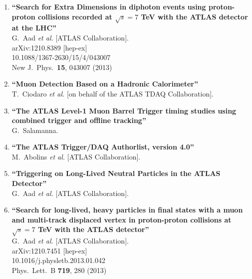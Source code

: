 \documentclass{article}
\begin{document}
\begin{enumerate}
\item%
{\bf ``Search for Extra Dimensions in diphoton events using proton-proton collisions recorded at $\sqrt{s}=7$ TeV with the ATLAS detector at the LHC''}
  \\{}G.~Aad {\it et al.}  [ATLAS Collaboration].
  \\{}arXiv:1210.8389 [hep-ex]
    \\{}10.1088/1367-2630/15/4/043007
\\{}New J.\ Phys.\  {\bf 15}, 043007 (2013) %


\item%
{\bf ``Muon Detection Based on a Hadronic Calorimeter''}
  \\{}T.~Ciodaro {\it et al.}  [on behalf of the ATLAS TDAQ Collaboration].
  



\item%
{\bf ``The ATLAS Level-1 Muon Barrel Trigger timing studies using combined trigger and offline tracking''}
  \\{}G.~Salamanna.
  



\item%
{\bf ``The ATLAS Trigger/DAQ Authorlist, version 4.0''}
  \\{}M.~Abolins {\it et al.}  [ATLAS Collaboration].
  



\item%
{\bf ``Triggering on Long-Lived Neutral Particles in the ATLAS Detector''}
  \\{}G.~Aad {\it et al.}  [ATLAS Collaboration].
  


\item%
{\bf ``Search for long-lived, heavy particles in final states with a muon and multi-track displaced vertex in proton-proton collisions at $\sqrt{s}=7$ TeV with the ATLAS detector''}
  \\{}G.~Aad {\it et al.}  [ATLAS Collaboration].
  \\{}arXiv:1210.7451 [hep-ex]
    \\{}10.1016/j.physletb.2013.01.042
\\{}Phys.\ Lett.\ B {\bf 719}, 280 (2013) %



\end{enumerate}
\end{document}
